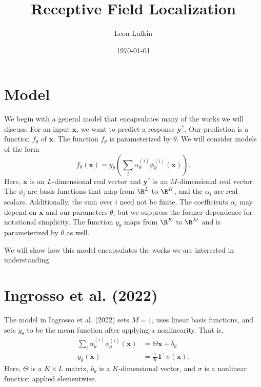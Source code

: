 \documentclass{article}
\title{Receptive Field Localization}
\author{Leon Lufkin}
\date{\today}
\begin{document}
\section{Model}
We begin with a general model that encapsulates many of the works we will discuss.
For an input $\mathbf{x}$, we want to predict a response $\mathbf{y}^*$.
Our prediction is a function $f_\theta$ of $\mathbf{x}$.
The function $f_\theta$ is parameterized by $\theta$.
We will consider models of the form
\begin{equation}
  \label{eq:general_model}
  f_\theta(\mathbf{x}) = y_\theta \left( \sum_i \alpha_\theta^{(i)} \phi_\theta^{(i)} (\mathbf{x}) \right).
\end{equation}
Here, $\mathbf{x}$ is an $L$-dimensional real vector and $\mathbf{y}^*$ is an $M$-dimensional real vector.
The $\phi_i$ are basis functions that map from $\R^L$ to $\R^K$, and the $\alpha_i$ are real scalars.
Additionally, the sum over $i$ need not be finite.
The coefficients $\alpha_i$ may depend on $\mathbf{x}$ and our parameters $\theta$, but we suppress the former dependence for notational simplicity. 
The function $y_\theta$ maps from $\R^K$ to $\R^M$ and is parameterized by $\theta$ as well.

We will show how this model encapsulates the works we are interested in understanding.

\section{Ingrosso et al. (2022)}
The model in Ingrosso et al. (2022) sets $M = 1$, uses linear basis functions, and sets $y_\theta$ to be the mean function after applying a nonlinearity.
That is,
\begin{align}
  \sum_i \alpha_\theta^{(i)} \phi_\theta^{(i)} (\mathbf{x}) &= \Theta \mathbf{x} + b_\theta \\
  y_\theta(\mathbf{x}) &= \frac{1}{K} \bm{1}^\top \sigma(\mathbf{x}).
\end{align}
Here, $\Theta$ is a $K \times L$ matrix, $b_\theta$ is a $K$-dimensional vector, and $\sigma$ is a nonlinear function applied elementwise.
\end{document}
